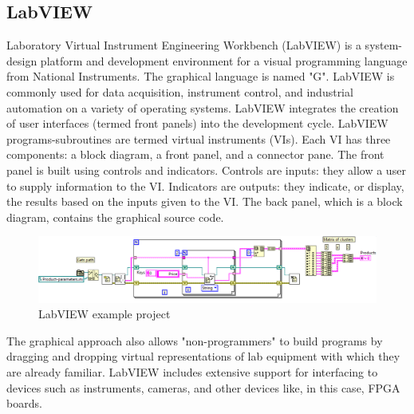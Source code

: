 \subsection{LabVIEW}
\noindent Laboratory Virtual Instrument Engineering Workbench (LabVIEW) is a system-design platform and development environment for a visual programming language from National Instruments. The graphical language is named "G". LabVIEW is commonly used for data acquisition, instrument control, and industrial automation on a variety of operating systems.
LabVIEW integrates the creation of user interfaces (termed front panels) into the development cycle. LabVIEW programs-subroutines are termed virtual instruments (VIs). Each VI has three components: a block diagram, a front panel, and a connector pane.
The front panel is built using controls and indicators. Controls are inputs: they allow a user to supply information to the VI. Indicators are outputs: they indicate, or display, the results based on the inputs given to the VI. The back panel, which is a block diagram, contains the graphical source code.
\begin{figure}[H]
	\centering
	\includegraphics[width=0.9\linewidth]{IMG/ch3/LABVIEW}
	\caption{LabVIEW example project}
	\label{fig:labview}
\end{figure}
\noindent The graphical approach also allows "non-programmers" to build programs by dragging and dropping virtual representations of lab equipment with which they are already familiar.
\newline
LabVIEW includes extensive support for interfacing to devices such as instruments, cameras, and other devices like, in this case, FPGA boards.

